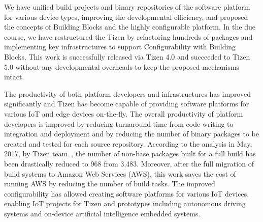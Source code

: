 
We have unified build projects and binary repositories of the software platform for various device types, improving the developmental efficiency, and proposed the concepts of Building Blocks and the highly configurable platform.
In the due course, we have restructured the Tizen by refactoring hundreds of packages and implementing key infrastructures to support Configurability with Building Blocks.
This work is successfully released via Tizen 4.0 and succeeded to Tizen 5.0 without any developmental overheads to keep the proposed mechanisms intact.


The productivity of both platform developers and infrastructures has improved significantly and Tizen has become capable of providing software platforms for various IoT and edge devices on-the-fly.
The overall productivity of platform developers is improved by reducing turnaround time from code writing to integration and deployment and by reducing the number of binary packages to be created and tested for each source repository.
According to the analysis in May, 2017, by Tizen team~\cite{2Ham2017TDC}, the number of non-base packages built for a full build has been drastically reduced to 968 from 3,483.
Moreover, after the full migration of build systems to Amazon Web Services (AWS), this work saves the cost of running AWS by reducing the number of build tasks.
The improved configurability has allowed creating software platforms for various IoT devices, enabling IoT projects for Tizen and prototypes including autonomous driving systems and on-device artificial intelligence embedded systems.